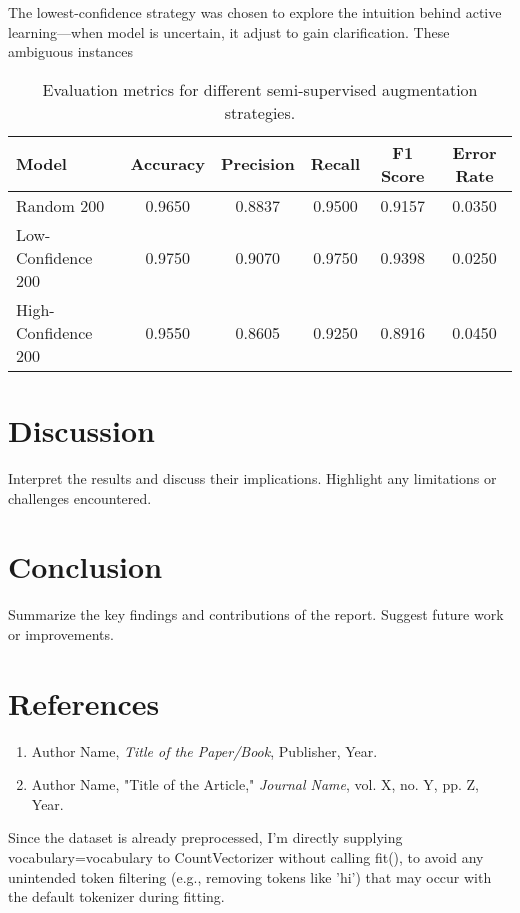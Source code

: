 \documentclass[a4paper,12pt]{article}
\begin{document}
The lowest-confidence strategy was chosen to explore the intuition behind active learning—when model is uncertain, it adjust to gain clarification. These ambiguous instances 


\begin{table}[h!]
\centering
\begin{tabular}{lccccc}
\hline
\textbf{Model} & \textbf{Accuracy} & \textbf{Precision} & \textbf{Recall} & \textbf{F1 Score} & \textbf{Error Rate} \\
\hline
Random 200         & 0.9650 & 0.8837 & 0.9500 & 0.9157 & 0.0350 \\
Low-Confidence 200 & 0.9750 & 0.9070 & 0.9750 & 0.9398 & 0.0250 \\
High-Confidence 200& 0.9550 & 0.8605 & 0.9250 & 0.8916 & 0.0450 \\
\hline
\end{tabular}
\caption{Evaluation metrics for different semi-supervised augmentation strategies.}
\label{tab:evaluation-metrics}
\end{table}
    

\section{Discussion}
Interpret the results and discuss their implications. Highlight any limitations or challenges encountered.

\section{Conclusion}
Summarize the key findings and contributions of the report. Suggest future work or improvements.

\section*{References}
\begin{enumerate}
    \item Author Name, \textit{Title of the Paper/Book}, Publisher, Year.
    \item Author Name, "Title of the Article," \textit{Journal Name}, vol. X, no. Y, pp. Z, Year.
\end{enumerate}


Since the dataset is already preprocessed, I'm directly supplying vocabulary=vocabulary to CountVectorizer without calling fit(), to avoid any unintended token filtering (e.g., removing tokens like 'hi') that may occur with the default tokenizer during fitting.
\end{document}
